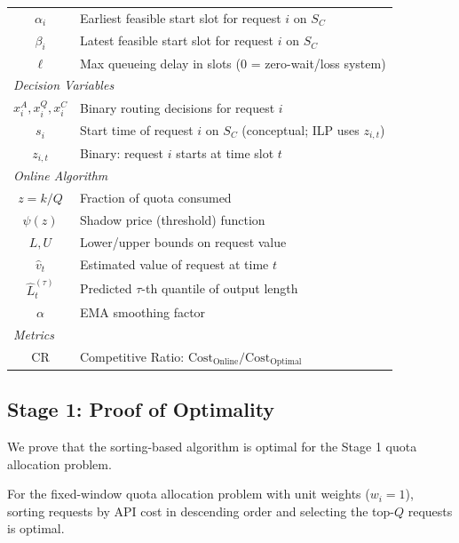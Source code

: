 \begin{table}[h]
\begin{center}
\begin{tabular}{cl}
$\alpha_i$ & Earliest feasible start slot for request $i$ on $S_C$ \\
$\beta_i$ & Latest feasible start slot for request $i$ on $S_C$ \\
$\ell$ & Max queueing delay in slots (0 = zero-wait/loss system) \\
\midrule
\multicolumn{2}{l}{\textit{Decision Variables}} \\
$x_i^A, x_i^Q, x_i^C$ & Binary routing decisions for request $i$ \\
$s_i$ & Start time of request $i$ on $S_C$ (conceptual; ILP uses $z_{i,t}$) \\
$z_{i,t}$ & Binary: request $i$ starts at time slot $t$ \\
\midrule
\multicolumn{2}{l}{\textit{Online Algorithm}} \\
$z = k/Q$ & Fraction of quota consumed \\
$\psi(z)$ & Shadow price (threshold) function \\
$L, U$ & Lower/upper bounds on request value \\
$\hat{v}_t$ & Estimated value of request at time $t$ \\
$\hat{L}_t^{(\tau)}$ & Predicted $\tau$-th quantile of output length \\
$\alpha$ & EMA smoothing factor \\
\midrule
\multicolumn{2}{l}{\textit{Metrics}} \\
CR & Competitive Ratio: $\text{Cost}_{\text{Online}} / \text{Cost}_{\text{Optimal}}$ \\
\bottomrule
\end{tabular}
\end{center}
\end{table}

\subsection{Stage 1: Proof of Optimality}
\label{app:stage1_proof}

We prove that the sorting-based algorithm is optimal for the Stage 1 quota allocation problem.

\begin{theorem}
For the fixed-window quota allocation problem with unit weights ($w_i = 1$), sorting requests by API cost in descending order and selecting the top-$Q$ requests is optimal.
\end{theorem}


